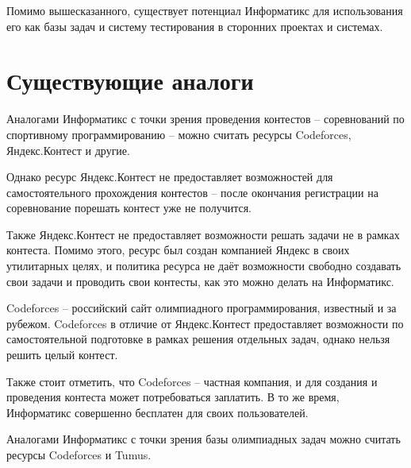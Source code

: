 Помимо вышесказанного, существует потенциал Информатикс для использования его как базы задач и систему тестирования в сторонних проектах и системах.

\section{Существующие аналоги}

Аналогами Информатикс с точки зрения проведения контестов
-- соревнований по спортивному программированию -- 
можно считать ресурсы Codeforces, Яндекс.Контест и другие.

Однако ресурс Яндекс.Контест не предоставляет возможностей для самостоятельного прохождения контестов -- после окончания регистрации на соревнование порешать контест уже не получится.

Также Яндекс.Контест не предоставляет возможности решать задачи не в рамках контеста.
Помимо этого, ресурс был создан компанией Яндекс в своих утилитарных целях,
и политика ресурса не даёт возможности свободно создавать свои задачи
и проводить свои контесты, как это можно делать на Информатикс.

Codeforces -- российский сайт олимпиадного программирования, известный и за рубежом\cite{codeforces_countries}.
Codeforces в отличие от Яндекс.Контест предоставляет возможности по самостоятельной подготовке в рамках решения отдельных задач, однако нельзя решить целый контест.

Также стоит отметить, что Codeforces -- частная компания, 
и для создания и проведения контеста может потребоваться заплатить.
В то же время, Информатикс совершенно бесплатен для своих пользователей.

Аналогами Информатикс с точки зрения базы олимпиадных задач 
можно считать ресурсы Codeforces и Tumus.

